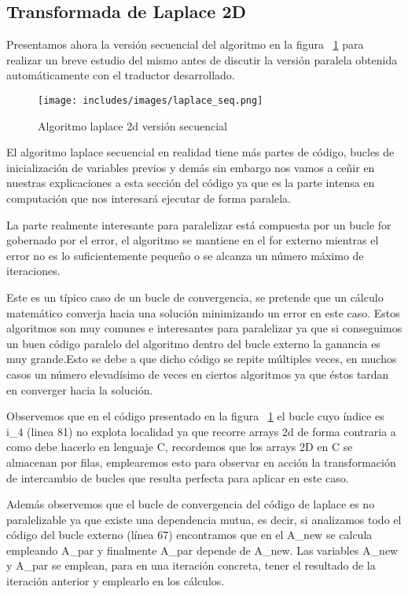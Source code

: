 \subsection{Transformada de Laplace 2D}


Presentamos ahora la versión secuencial del algoritmo en la figura ~\ref{fig:Laplaced2dseq} para realizar un breve estudio del mismo antes de discutir la versión paralela obtenida automáticamente con el traductor desarrollado.

\begin{figure}[t]
\centering
\texttt{[image: includes/images/laplace\_seq.png]}
\caption{Algoritmo laplace 2d versión secuencial}
\label{fig:Laplaced2dseq}
\end{figure}

El algoritmo laplace secuencial en realidad tiene más partes de código, bucles de inicialización de variables previos y demás sin embargo nos vamos a ceñir en nuestras explicaciones a esta sección del código ya que es la parte intensa en computación que nos interesará ejecutar de forma paralela.

La parte realmente interesante para paralelizar está compuesta por un bucle for gobernado por el error, el algoritmo se mantiene en el for externo mientras el error no es lo suficientemente pequeño o se alcanza un número máximo de iteraciones.

Este es un típico caso de un bucle de convergencia, se pretende que un cálculo matemático converja hacia una solución minimizando un error en este caso. Estos algoritmos son muy comunes e interesantes para paralelizar ya que si conseguimos un buen código paralelo del algoritmo dentro del bucle externo la ganancia es muy grande.Esto se debe a que dicho código se repite múltiples veces, en muchos casos un número elevadísimo de veces en ciertos algoritmos ya que éstos tardan en converger hacia la solución.

Observemos que en el código presentado en la figura ~\ref{fig:Laplaced2dseq} el bucle cuyo índice es i\_4 (linea 81) no explota localidad ya que recorre arrays 2d de forma contraria a como debe hacerlo en lenguaje C, recordemos que los arrays 2D en C se almacenan por filas, emplearemos esto para observar en acción la transformación de intercambio de bucles que resulta perfecta para aplicar en este caso.

Además observemos que el bucle de convergencia del código de laplace es no paralelizable ya que existe una dependencia mutua, es decir, si analizamos todo el código del bucle externo (línea 67) encontramos que en el A\_new se calcula empleando A\_par y finalmente A\_par depende de A\_new. Las variables A\_new y A\_par se emplean, para en una iteración concreta, tener el resultado de la iteración anterior y emplearlo en los cálculos.

